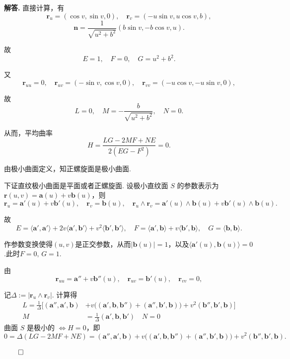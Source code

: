 \documentclass[12pt, a4paper, oneside]{ctexart}
\newenvironment{solution}{\par\noindent\textbf{解答. }}{\hfill$\qed$\par}
\begin{document}
	\begin{solution}
		直接计算，有
		\[
		\mathbf{r}_{u} = (\cos v, \sin v, 0), \quad \mathbf{r}_{v} = (-u \sin v, u \cos v, b),
		\]
		\[
		\mathbf{n} = \frac{1}{\sqrt{u^2 + b^2}}(b \sin v, -b \cos v, u).
		\]
		
		故
		\[
		E = 1, \quad F = 0, \quad G = u^2 + b^2.
		\]
		
		又
		\[
		\mathbf{r}_{uu} = 0, \quad \mathbf{r}_{uv} = (-\sin v, \cos v, 0), \quad \mathbf{r}_{vv} = (-u \cos v, -u \sin v, 0),
		\]
		
		故
		\[
		L = 0, \quad M = -\frac{b}{\sqrt{u^2 + b^2}}, \quad N = 0.
		\]
		
		从而，平均曲率
		\[
		H = \frac{LG - 2MF + NE}{2(EG - F^2)} = 0.
		\]
		
		由极小曲面定义，知正螺旋面是极小曲面.
		
		下证直纹极小曲面是平面或者正螺旋面. 设极小直纹面 $S$ 的参数表示为 $\mathbf{r}(u, v) = \mathbf{a}(u) + v\mathbf{b}(u)$，则
		\[
		\mathbf{r}_u = \mathbf{a}'(u) + v\mathbf{b}'(u), \quad \mathbf{r}_v = \mathbf{b}(u), \quad \mathbf{r}_u \wedge \mathbf{r}_v = \mathbf{a}'(u) \wedge \mathbf{b}(u) + v\mathbf{b}'(u) \wedge \mathbf{b}(u).
		\]
		
		故
		\[
		E = \langle \mathbf{a}', \mathbf{a}' \rangle + 2v \langle \mathbf{a}', \mathbf{b}' \rangle + v^{2}\langle \mathbf{b}', \mathbf{b}'\rangle, \quad F = \langle\mathbf{a}', \mathbf{b}\rangle + v \langle \mathbf{b}', \mathbf{b} \rangle, \quad G = \langle \mathbf{b}, \mathbf{b} \rangle.
		\]
		
		作参数变换使得$(u,v)$是正交参数，从而$|\mathbf{b}(u)| = 1$，以及$\langle \mathbf{a}'(u), \mathbf{b}(u) \rangle = 0$.此时$F = 0,\, G = 1$.
		
		由
		\[
		\mathbf{r}_{uu} = \mathbf{a}'' + v \mathbf{b}''(u), \quad \mathbf{r}_{uv} = \mathbf{b}'(u), \quad \mathbf{r}_{vv} = 0,
		\]
		
		记$\Delta:=|\mathbf{r}_{u}\wedge\mathbf{r}_{v}|$. 计算得
		\[\begin{aligned}
			L = \frac{1}{\Delta} \Big[( \mathbf{a}'', \mathbf{a}', \mathbf{b})  &+ v \big(( \mathbf{a}', \mathbf{b}, \mathbf{b}'' ) +  (\mathbf{a}'', \mathbf{b}', \mathbf{b})\big) + v^2 (\mathbf{b}'', \mathbf{b}', \mathbf{b})\Big]\\ M &= \frac{1}{\Delta}(\mathbf{a}', \mathbf{b}, \mathbf{b}')\quad  N = 0
		\end{aligned}
		\]
		曲面 $S$ 是极小的 $\Leftrightarrow H = 0$，即
		\[
		0 = \Delta (L G - 2 M F + N E) = ( \mathbf{a}'', \mathbf{a}', \mathbf{b})  + v \big(( \mathbf{a}', \mathbf{b}, \mathbf{b}'' ) +  (\mathbf{a}'', \mathbf{b}', \mathbf{b})\big) + v^2 (\mathbf{b}'', \mathbf{b}', \mathbf{b}).
		\]
		

\end{solution}
\end{document}
